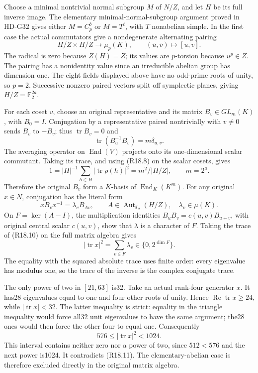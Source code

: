 Choose a minimal nontrivial normal subgroup \(M\) of
\(N/Z\), and let \(H\) be its full inverse image. The
elementary minimal-normal-subgroup argument proved in
HD-G32 gives either \(M=C_p^b\) or \(M=T^t\), with
\(T\) nonabelian simple. In the first case the actual
commutators give a nondegenerate alternating pairing
\[
 H/Z\times H/Z\longrightarrow\mu_p(K),\qquad
                        (\bar u,\bar v)\longmapsto[u,v].
                                                               \tag{R18.7}
\]
The radical is zero because \(Z(H)=Z\); its values are
\(p\)-torsion because \(u^p\in Z\). The pairing has
a nonidentity value since an irreducible abelian group
has dimension one. The eight fields displayed above
have no odd-prime roots of unity, so \(p=2\).
Successive nonzero paired vectors split off symplectic
planes, giving \(H/Z=\mathbb F_2^{2a}\).

For each coset \(v\), choose an original representative
and its matrix \(B_v\in GL_m(K)\), with \(B_0=I\).
Conjugation by a representative paired nontrivially with
\(v\ne0\) sends \(B_v\) to \(-B_v\); thus
\(\operatorname{tr}B_v=0\) and
\[
 \operatorname{tr}(B_u^{-1}B_v)=m\delta_{u,v}.
                                                               \tag{R18.8}
\]
The averaging operator on \(\operatorname{End}(V)\)
projects onto its one-dimensional scalar commutant.
Taking its trace, and using (R18.8) on the scalar cosets,
gives
\[
 1=|H|^{-1}\sum_{h\in H}|\operatorname{tr}\rho(h)|^2
       =m^2/|H/Z|,\qquad m=2^a.                         \tag{R18.9}
\]
Therefore the original \(B_v\) form a \(K\)-basis of
\(\operatorname{End}_K(K^m)\). For any original \(x\in N\),
conjugation has the literal form
\[
 xB_vx^{-1}=\lambda_vB_{Av},\qquad
 A\in\operatorname{Aut}_{\mathbb F_2}(H/Z),\quad
 \lambda_v\in\mu(K).                                   \tag{R18.10}
\]
On \(F=\ker(A-I)\), the multiplication identities
\(B_uB_v=c(u,v)B_{u+v}\), with original central scalar
\(c(u,v)\), show that \(\lambda\) is a character of \(F\).
Taking the trace of (R18.10) on the full matrix algebra gives
\[
 |\operatorname{tr}x|^2
       =\sum_{v\in F}\lambda_v\in\{0,2^{\dim F}\}.
                                                               \tag{R18.11}
\]
The equality with the squared absolute trace uses finite
order: every eigenvalue has modulus one, so the trace of
the inverse is the complex conjugate trace.

The only power of two in \([21,63]\) is32. Take an actual
rank-four generator \(x\). It has28 eigenvalues equal to
one and four other roots of unity. Hence
\(\operatorname{Re}\operatorname{tr}x\ge24\), while
\(|\operatorname{tr}x|<32\). The latter inequality is
strict: equality in the triangle inequality would force
all32 unit eigenvalues to have the same argument; the28
ones would then force the other four to equal one.
Consequently
\[
                  576\le|\operatorname{tr}x|^2<1024.      \tag{R18.12}
\]
This interval contains neither zero nor a power of two,
since \(512<576\) and the next power is1024.
It contradicts (R18.11). The elementary-abelian case is
therefore excluded directly in the original matrix algebra.

